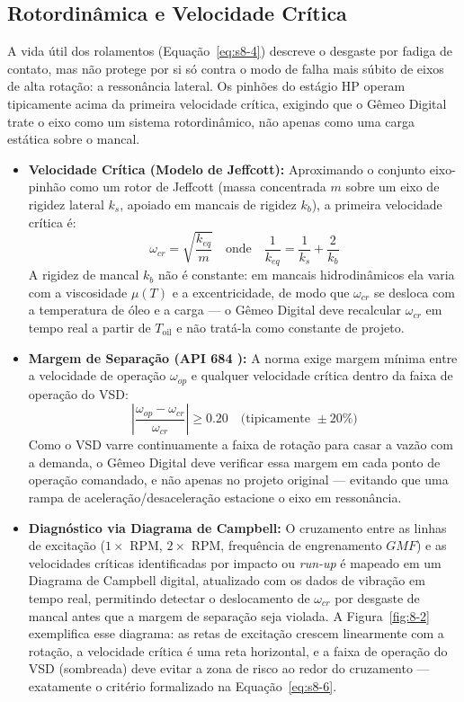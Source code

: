 \documentclass[12pt,a4paper]{article}
\numberwithin{equation}{section}
\numberwithin{table}{section}
\numberwithin{figure}{section}
\begin{document}
	\subsection{\textbf{Rotordinâmica e Velocidade Crítica}}
	A vida útil dos rolamentos (Equação~\eqref{eq:s8-4}) descreve o desgaste por fadiga de contato, mas não protege por si só contra o modo de falha mais súbito de eixos de alta rotação: a ressonância lateral. Os pinhões do estágio HP operam tipicamente acima da primeira velocidade crítica, exigindo que o Gêmeo Digital trate o eixo como um sistema rotordinâmico, não apenas como uma carga estática sobre o mancal.
	\begin{itemize}
		\item \textbf{Velocidade Crítica (Modelo de Jeffcott):} Aproximando o conjunto eixo-pinhão como um rotor de Jeffcott (massa concentrada $m$ sobre um eixo de rigidez lateral $k_s$, apoiado em mancais de rigidez $k_b$), a primeira velocidade crítica é:
		\begin{equation}\label{eq:s8-5}
 \omega_{cr} = \sqrt{\frac{k_{eq}}{m}} \quad \text{onde} \quad \frac{1}{k_{eq}} = \frac{1}{k_s} + \frac{2}{k_b} 
\end{equation}
		A rigidez de mancal $k_b$ não é constante: em mancais hidrodinâmicos ela varia com a viscosidade $\mu(T)$ e a excentricidade, de modo que $\omega_{cr}$ se desloca com a temperatura de óleo e a carga — o Gêmeo Digital deve recalcular $\omega_{cr}$ em tempo real a partir de $T_{\text{oil}}$ e não tratá-la como constante de projeto.
		\item \textbf{Margem de Separação (API 684 \cite{api684}):} A norma exige margem mínima entre a velocidade de operação $\omega_{op}$ e qualquer velocidade crítica dentro da faixa de operação do VSD:
		\begin{equation}\label{eq:s8-6}
 \left| \frac{\omega_{op} - \omega_{cr}}{\omega_{cr}} \right| \geq 0.20 \quad \text{(tipicamente } \pm 20\% \text{)} 
\end{equation}
		Como o VSD varre continuamente a faixa de rotação para casar a vazão com a demanda, o Gêmeo Digital deve verificar essa margem em cada ponto de operação comandado, e não apenas no projeto original — evitando que uma rampa de aceleração/desaceleração estacione o eixo em ressonância.
		\item \textbf{Diagnóstico via Diagrama de Campbell:} O cruzamento entre as linhas de excitação ($1\times$ RPM, $2\times$ RPM, frequência de engrenamento $GMF$) e as velocidades críticas identificadas por impacto ou \textit{run-up} é mapeado em um Diagrama de Campbell digital, atualizado com os dados de vibração em tempo real, permitindo detectar o deslocamento de $\omega_{cr}$ por desgaste de mancal antes que a margem de separação seja violada. A Figura~\ref{fig:8-2} exemplifica esse diagrama: as retas de excitação crescem linearmente com a rotação, a velocidade crítica é uma reta horizontal, e a faixa de operação do VSD (sombreada) deve evitar a zona de risco ao redor do cruzamento — exatamente o critério formalizado na Equação~\eqref{eq:s8-6}.
	\end{itemize}
\end{document}
